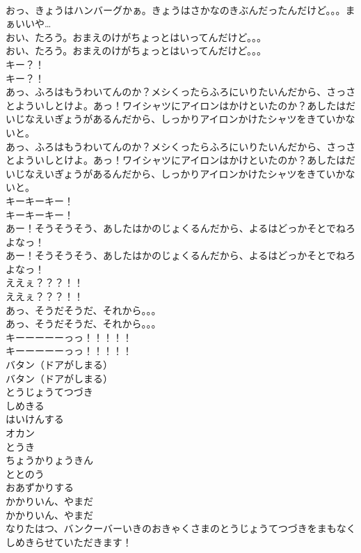 \documentclass[8pt]{extreport}
\begin{document}
\begin{CJK}{UTF8}{min}
\\	おっ、きょうはハンバーグかぁ。きょうはさかなのきぶんだったんだけど。。。まぁいいや… 
\\	おい、たろう。おまえのけがちょっとはいってんだけど。。。	
\\	おい、たろう。おまえのけがちょっとはいってんだけど。。。 
\\	キー？！	
\\	キー？！ 
\\	あっ、ふろはもうわいてんのか？メシくったらふろにいりたいんだから、さっさとよういしとけよ。あっ！ワイシャツにアイロンはかけといたのか？あしたはだいじなえいぎょうがあるんだから、しっかりアイロンかけたシャツをきていかないと。	
\\	あっ、ふろはもうわいてんのか？メシくったらふろにいりたいんだから、さっさとよういしとけよ。あっ！ワイシャツにアイロンはかけといたのか？あしたはだいじなえいぎょうがあるんだから、しっかりアイロンかけたシャツをきていかないと。 
\\	キーキーキー！	
\\	キーキーキー！ 
\\	あー！そうそうそう、あしたはかのじょくるんだから、よるはどっかそとでねろよなっ！	
\\	あー！そうそうそう、あしたはかのじょくるんだから、よるはどっかそとでねろよなっ！ 
\\	ええぇ？？？！！	
\\	ええぇ？？？！！ 
\\	あっ、そうだそうだ、それから。。。	
\\	あっ、そうだそうだ、それから。。。 
\\	キーーーーーっっ！！！！！	
\\	キーーーーーっっ！！！！！ 
\\	バタン（ドアがしまる）	
\\	バタン（ドアがしまる） 
\\	とうじょうてつづき
\\	しめきる
\\	はいけんする
\\	オカン
\\	とうき
\\	ちょうかりょうきん
\\	ととのう
\\	おあずかりする
\\	かかりいん、やまだ	
\\	かかりいん、やまだ 
\\	なりたはつ、バンクーバーいきのおきゃくさまのとうじょうてつづきをまもなくしめきらせていただきます！	

\end{CJK}
\end{document}
